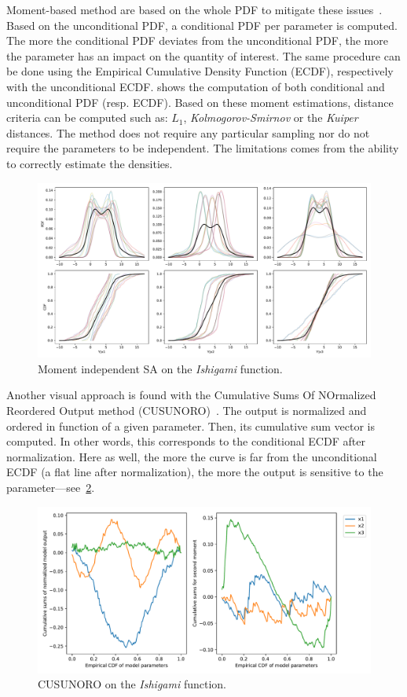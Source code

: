 Moment-based method are based on the whole PDF to mitigate these issues~\cite{borgonovo2007}. Based on the unconditional PDF, a conditional PDF per parameter is computed. The more the conditional PDF deviates from the unconditional PDF, the more the parameter has an impact on the quantity of interest. The same procedure can be done using the Empirical Cumulative Density Function (ECDF), respectively with the unconditional ECDF.  shows the computation of both conditional and unconditional PDF (resp. ECDF). Based on these moment estimations, distance criteria can be computed such as: $L_1$, \emph{Kolmogorov-Smirnov} or the \emph{Kuiper} distances. The method does not require any particular sampling nor do not require the parameters to be independent. The limitations comes from the ability to correctly estimate the densities.

\begin{figure}[H]
\centering
\includegraphics[width=0.8\linewidth,keepaspectratio]{fig/literature/moment_independent-ishigami.pdf}
\caption{Moment independent SA on the \emph{Ishigami} function.}
\label{fig:moment_sa}
\end{figure}

Another visual approach is found with the Cumulative Sums Of NOrmalized Reordered Output method (CUSUNORO)~\cite{Plischke2012}. The output is normalized and ordered in function of a given parameter. Then, its cumulative sum vector is computed. In other words, this corresponds to the conditional ECDF after normalization. Here as well, the more the curve is far from the unconditional ECDF (a flat line after normalization), the more the output is sensitive to the parameter---see~\cref{fig:cusunoro}.

\begin{figure}[H]
\centering
\includegraphics[width=0.8\linewidth,keepaspectratio]{fig/literature/cusunoro-ishigami.pdf}
\caption{CUSUNORO on the \emph{Ishigami} function.}
\label{fig:cusunoro}
\end{figure}


